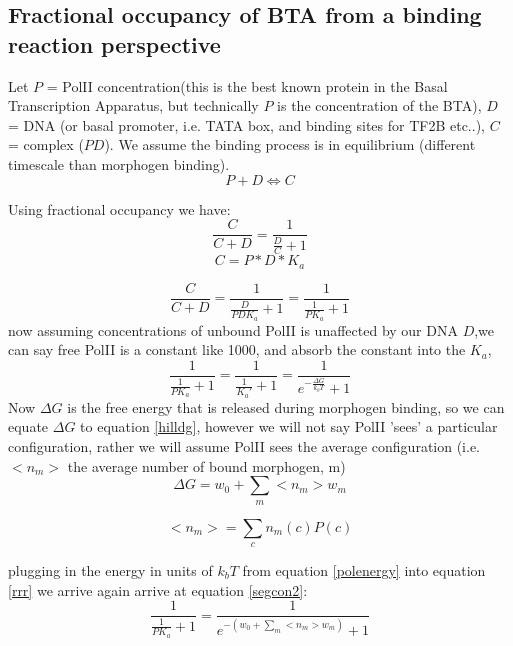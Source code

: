 \subsection{Fractional occupancy of BTA from a binding reaction perspective }
Let $P$ = PolII concentration(this is the best known protein in the Basal Transcription Apparatus, but technically $P$ is the concentration of the BTA), $D$ = DNA (or basal promoter, i.e. TATA box, and binding sites for TF2B etc..), $C$ = complex ($PD$).  We assume the binding process is in equilibrium (different timescale than morphogen binding).
\begin{equation}\label{}
    P + D \Leftrightarrow C
\end{equation}

Using fractional occupancy we have:
\begin{equation}\label{}
    \frac{C}{C + D} = \frac{1}{\frac{D}{C} + 1}
\end{equation}
\begin{equation}\label{}
    C = P*D*K_a
\end{equation}

\begin{equation}\label{}
   \frac{C}{C + D} = \frac{1}{\frac{D}{PDK_a} + 1} = \frac{1}{\frac{1}{PK_a} + 1}
\end{equation}
now assuming concentrations of unbound PolII is unaffected by our DNA $D$,we can say free PolII is a constant like 1000, and absorb the constant into the $K_a$,
\begin{equation}\label{rrr}
    \frac{1}{\frac{1}{PK_a} + 1} = \frac{1}{\frac{1}{K_a'} + 1} =\frac{1}{e^{-\frac{\Delta G}{k_bT} }+ 1}
\end{equation}
Now $\Delta G$ is the free energy that is released during morphogen binding, so  we can equate $ \Delta G $ to equation \eqref{hilldg}, however we will not say PolII 'sees' a particular configuration, rather we will assume PolII sees the average configuration (i.e. $<n_m>$ the average number of bound morphogen, m)
\begin{equation}\label{polenergy}
    \Delta G =  w_{0} + \sum_{m}  <n_m> w_{m}
\end{equation}

\begin{equation}\label{}
     <n_m> =\sum_c n_m(c) P(c)
     \end{equation}

plugging in the energy in units of $k_b T$  from equation \eqref{polenergy} into equation \eqref{rrr} we arrive again arrive at equation \eqref{segcon2}:
\begin{equation}\label{themodel}
      \frac{1}{\frac{1}{PK_a} + 1} = \frac{1}{e^{- (w_{0} + \sum_{m}  <n_m> w_{m} ) }+ 1}
\end{equation}

